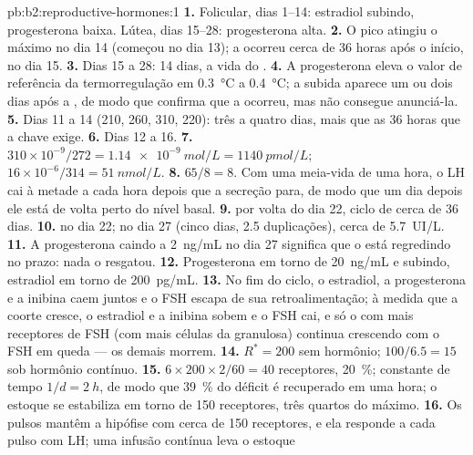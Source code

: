 \begin{solution}{pb:b2:reproductive-hormones:1}
\textbf{1.} Folicular, dias 1--14: estradiol subindo, progesterona
baixa. Lútea, dias 15--28: progesterona alta.
\textbf{2.} O pico atingiu o máximo no dia 14 (começou no dia 13); a
 ocorreu cerca de 36 horas após o início, no dia 15.
\textbf{3.} Dias 15 a 28: 14 dias, a vida do .
\textbf{4.} A progesterona eleva o valor de referência da
termorregulação em \qty{0.3}{\celsius} a \qty{0.4}{\celsius}; a subida
aparece um ou dois dias após a , de modo que confirma que a
 ocorreu, mas não consegue anunciá-la.
\textbf{5.} Dias 11 a 14 (210, 260, 310, 220): três a quatro dias, mais
que as 36 horas que a chave exige.
\textbf{6.} Dias 12 a 16.
\textbf{7.} $310\times 10^{-9}/272 = \qty{1.14e-9}{mol/L} =
\qty{1140}{pmol/L}$; $16\times 10^{-6}/314 = \qty{51}{nmol/L}$.
\textbf{8.} $65/8 = 8$. Com uma meia-vida de uma hora, o LH cai à
metade a cada hora depois que a secreção para, de modo que um dia
depois ele está de volta perto do nível basal.
\textbf{9.}  por volta do dia 22, ciclo de cerca de 36 dias.
\textbf{10.}  no dia 22; no dia 27 (cinco dias, 2.5
duplicações), cerca de \qty{5.7}{UI/L}.
\textbf{11.} A progesterona caindo a \qty{2}{ng/mL} no dia 27 significa
que o  está regredindo no prazo: nada o resgatou.
\textbf{12.} Progesterona em torno de \qty{20}{ng/mL} e subindo,
estradiol em torno de \qty{200}{pg/mL}.
\textbf{13.} No fim do ciclo, o estradiol, a progesterona e a inibina
caem juntos e o FSH escapa de sua retroalimentação; à medida que a
coorte cresce, o estradiol e a inibina sobem e o FSH cai, e só o
 com mais receptores de FSH (com mais células da granulosa)
continua crescendo com o FSH em queda --- os demais morrem.
\textbf{14.} $R^* = 200$ sem hormônio; $100/6.5 = 15$ sob hormônio
contínuo.
\textbf{15.} $6\times 200\times 2/60 = 40$ receptores, \qty{20}{\%};
constante de tempo $1/d = \qty{2}{h}$, de modo que \qty{39}{\%} do
déficit é recuperado em uma hora; o estoque se estabiliza em torno de
150 receptores, três quartos do máximo.
\textbf{16.} Os pulsos mantêm a hipófise com cerca de 150 receptores,
e ela responde a cada pulso com LH; uma infusão contínua leva o estoque

\end{solution}

